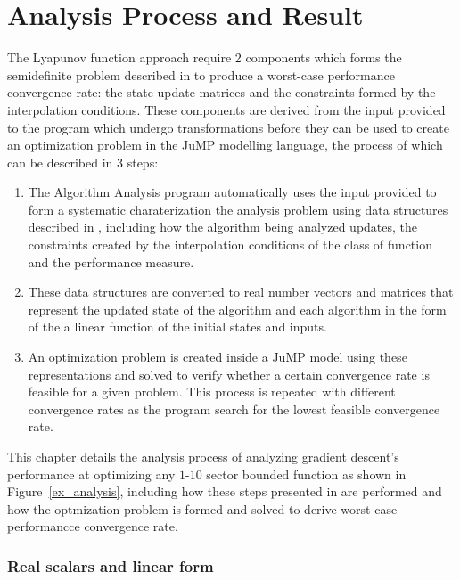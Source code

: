 \chapter{Analysis Process and Result}\label{chapter:result}

The Lyapunov function approach require 2 components which forms the semidefinite problem described in  to produce a worst-case performance convergence rate: the state update matrices and the constraints formed by the interpolation conditions. These components are derived from the input provided to the program which undergo transformations before they can be used to create an optimization problem in the JuMP modelling language, the process of which can be described in 3 steps:
\begin{enumerate}
    \item The Algorithm Analysis program automatically uses the input provided to form a systematic charaterization the analysis problem using data structures described in , including how the algorithm being analyzed updates, the constraints created by the interpolation conditions of the class of function and the performance measure.
    \item These data structures are converted to real number vectors and matrices that represent the updated state of the algorithm and each algorithm in the form of the a linear function of the initial states and inputs.
    \item An optimization problem is created inside a JuMP model using these representations and solved to verify whether a certain convergence rate is feasible for a given problem. This process is repeated with different convergence rates as the program search for the lowest feasible convergence rate.
\end{enumerate}

This chapter details the analysis process of analyzing gradient descent's performance at optimizing any $1$-$10$ sector bounded function as shown in Figure~\ref{ex_analysis}, including how these steps presented in  are performed and how the optmization problem is formed and solved to derive worst-case performancce convergence rate.

\subsection*{Real scalars and linear form}


